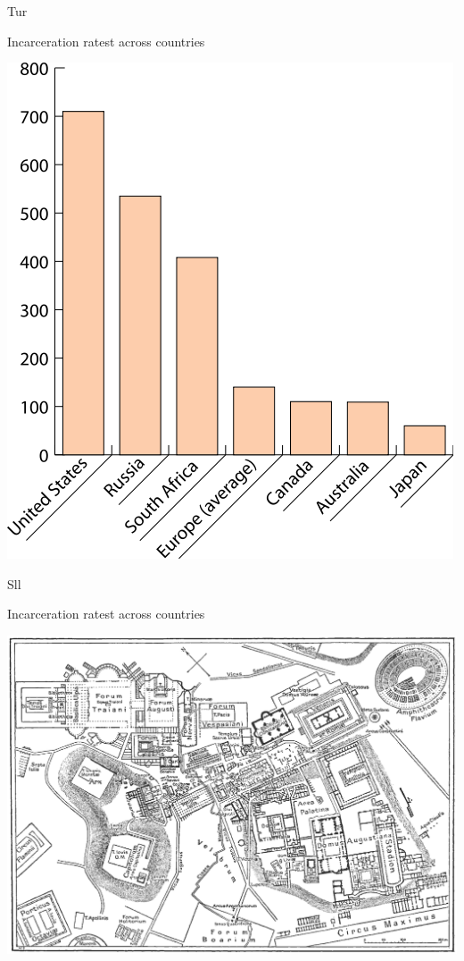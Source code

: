 \begin{map}{T}{ur}
\caption{Incarceration ratest across countries}
\label{chart:incarceration}
\includegraphics[width=\chartwidth,height=\chartheight]{incarceration}  
\end{map}

\begin{map}{S}{ll}
\caption{Incarceration ratest across countries}
\label{chart:incarceration}
\includegraphics[width=\chartwidth,height=\chartheight]{Rome}  
\end{map}

